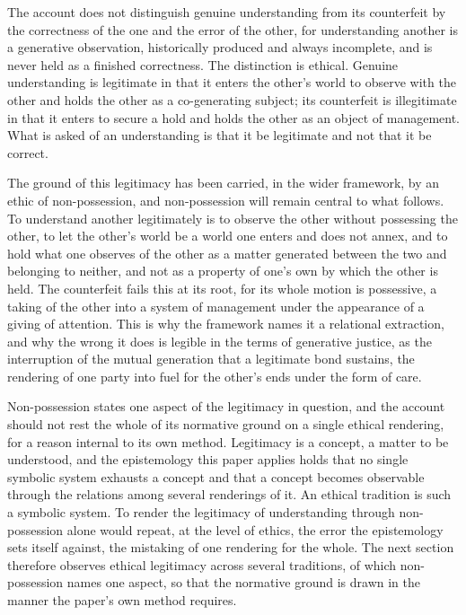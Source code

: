 \begin{claim}
The account does not distinguish genuine understanding from its counterfeit by the correctness of the one and the error of the other, for understanding another is a generative observation, historically produced and always incomplete, and is never held as a finished correctness. The distinction is ethical. Genuine understanding is legitimate in that it enters the other's world to observe with the other and holds the other as a co-generating subject; its counterfeit is illegitimate in that it enters to secure a hold and holds the other as an object of management. What is asked of an understanding is that it be legitimate and not that it be correct.
\end{claim}

The ground of this legitimacy has been carried, in the wider framework, by an ethic of non-possession, and non-possession will remain central to what follows. To understand another legitimately is to observe the other without possessing the other, to let the other's world be a world one enters and does not annex, and to hold what one observes of the other as a matter generated between the two and belonging to neither, and not as a property of one's own by which the other is held. The counterfeit fails this at its root, for its whole motion is possessive, a taking of the other into a system of management under the appearance of a giving of attention. This is why the framework names it a relational extraction, and why the wrong it does is legible in the terms of generative justice, as the interruption of the mutual generation that a legitimate bond sustains, the rendering of one party into fuel for the other's ends under the form of care.

Non-possession states one aspect of the legitimacy in question, and the account should not rest the whole of its normative ground on a single ethical rendering, for a reason internal to its own method. Legitimacy is a concept, a matter to be understood, and the epistemology this paper applies holds that no single symbolic system exhausts a concept and that a concept becomes observable through the relations among several renderings of it. An ethical tradition is such a symbolic system. To render the legitimacy of understanding through non-possession alone would repeat, at the level of ethics, the error the epistemology sets itself against, the mistaking of one rendering for the whole. The next section therefore observes ethical legitimacy across several traditions, of which non-possession names one aspect, so that the normative ground is drawn in the manner the paper's own method requires.

